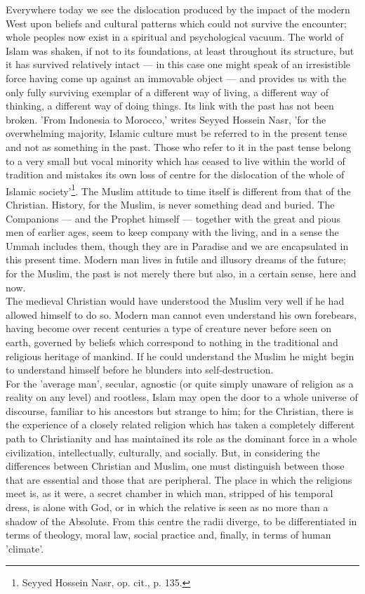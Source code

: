 \documentclass[10pt, twoside,openright]{book}
\begin{document}
Everywhere today we see the dislocation produced by the impact of the modern West upon beliefs and cultural patterns which could not survive the encounter; whole peoples now exist in a spiritual and psychological vacuum. The world of Islam was shaken, if not to its foundations, at least throughout its structure, but it has survived relatively intact --- in this case one might speak of an irresistible force having come up against an immovable object --- and provides us with the only fully surviving exemplar of a different way of living, a different way of thinking, a different way of doing things. Its link with the past has not been broken. 'From Indonesia to Morocco,' writes Seyyed Hossein Nasr, 'for the overwhelming majority, Islamic culture must be referred to in the present tense and not as something in the past. Those who refer to it in the past tense belong to a very small but vocal minority which has ceased to live within the world of tradition and mistakes its own loss of centre for the dislocation of the whole of Islamic society'\footnote{Seyyed Hossein Nasr, op. cit., p. 135.}. The Muslim attitude to time itself is different from that of the Christian. History, for the Muslim, is never something dead and buried. The Companions --- and the Prophet himself --- together with the great and pious men of earlier ages, seem to keep company with the living, and in a sense the Ummah includes them, though they are in Paradise and we are encapsulated in this present time. Modern man lives in futile and illusory dreams of the future; for the Muslim, the past is not merely there but also, in a certain sense, here and now. \\

The medieval Christian would have understood the Muslim very well if he had allowed himself to do so. Modern man cannot even understand his own forebears, having become over recent centuries a type of creature never before seen on earth, governed by beliefs which correspond to nothing in the traditional and religious heritage of mankind. If he could understand the Muslim he might begin to understand himself before he blunders into self\hyp{}destruction. \\

For the 'average man', secular, agnostic (or quite simply unaware of religion as a reality on any level) and rootless, Islam may open the door to a whole universe of discourse, familiar to his ancestors but strange to him; for the Christian, there is the experience of a closely related religion which has taken a completely different path to Christianity and has maintained its role as the dominant force in a whole civilization, intellectually, culturally, and socially. But, in considering the differences between Christian and Muslim, one must distinguish between those that are essential and those that are peripheral. The place in which the religions meet is, as it were, a secret chamber in which man, stripped of his temporal dress, is alone with God, or in which the relative is seen as no more than a shadow of the Absolute. From this centre the radii diverge, to be differentiated in terms of theology, moral law, social practice and, finally, in terms of human 'climate'. \\
\end{document}
